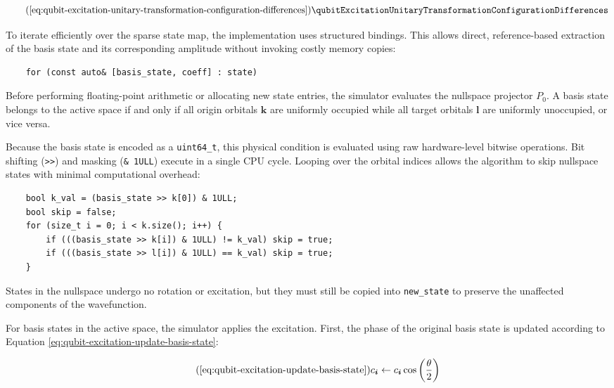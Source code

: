 \begin{equation} \tag{\ref{eq:qubit-excitation-unitary-transformation-configuration-differences}}
    \qubitExcitationUnitaryTransformationConfigurationDifferences
\end{equation}

To iterate efficiently over the sparse state map, the implementation uses structured bindings. This allows direct, reference-based extraction of the basis state and its corresponding amplitude without invoking costly memory copies:

\begin{verbatim}
    for (const auto& [basis_state, coeff] : state)
\end{verbatim}

Before performing floating-point arithmetic or allocating new state entries, the simulator evaluates the nullspace projector $P_0$. A basis state belongs to the active space if and only if all origin orbitals $\boldsymbol{k}$ are uniformly occupied while all target orbitals $\boldsymbol{l}$ are uniformly unoccupied, or vice versa.

Because the basis state is encoded as a \texttt{uint64\_t}, this physical condition is evaluated using raw hardware-level bitwise operations. Bit shifting (\texttt{>>}) and masking (\texttt{\& 1ULL}) execute in a single CPU cycle. Looping over the orbital indices allows the algorithm to skip nullspace states with minimal computational overhead:

\begin{verbatim}
    bool k_val = (basis_state >> k[0]) & 1ULL;
    bool skip = false;
    for (size_t i = 0; i < k.size(); i++) {
        if (((basis_state >> k[i]) & 1ULL) != k_val) skip = true;
        if (((basis_state >> l[i]) & 1ULL) == k_val) skip = true;
    }
\end{verbatim}

States in the nullspace undergo no rotation or excitation, but they must still be copied into \texttt{new\_state} to preserve the unaffected components of the wavefunction.

For basis states in the active space, the simulator applies the excitation. First, the phase of the original basis state is updated according to Equation \eqref{eq:qubit-excitation-update-basis-state}:

\begin{equation} \tag{\eqref{eq:qubit-excitation-update-basis-state}}
    c_{\boldsymbol{i}} \leftarrow c_{\boldsymbol{i}} \cos\left(\frac{\theta}{2}\right)
\end{equation}

